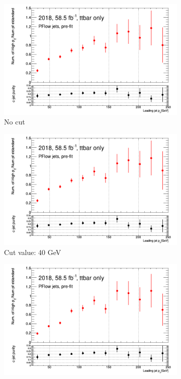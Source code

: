 \documentclass[letterpaper,12pt]{article}
\begin{document}
\begin{figure}[!h]
	\centering
	\begin{subfigure}[t]{.38\linewidth}
\includegraphics[width=1\textwidth]{FTAG_plots/stat_gains/statsgain_0GeV.png}
\caption{No cut}
\end{subfigure}
\begin{subfigure}[t]{.38\linewidth}
\includegraphics[width=1\textwidth]{FTAG_plots/stat_gains/statsgain_40GeV.png}
\caption{Cut value: 40 GeV}
\end{subfigure}
\begin{subfigure}[t]{.38\linewidth}
\includegraphics[width=1\textwidth]{FTAG_plots/stat_gains/statsgain_70GeV.png}

\end{subfigure}
\end{figure}
\end{document}
